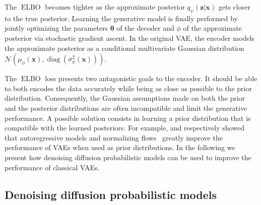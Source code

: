 \documentclass{article}
\newcommand{\diag}{\operatorname{diag}}
\begin{document}
The $\operatorname{ELBO}$ becomes tighter as the approximate posterior $q_\psi(\mathbf{z}|\mathbf{x})$ gets closer to the true posterior. 
Learning the generative model is finally performed by jointly optimizing the parameters $\mathbf{\theta}$ of the decoder and $\phi$ of the approximate posterior via stochastic gradient ascent. 
In the original VAE, the encoder models the approximate posterior as a conditional multivariate Gaussian distribution $\mathcal{N}(\mu_\phi(\mathbf{x}), \diag(\sigma_\phi^2(\mathbf{x})))$.

The $\operatorname{ELBO}$ loss presents two antagonistic goals to the encoder.
It should be able to both encodes the data accurately while being as close as possible to the prior distribution. Consequently, the Gaussian assumptions made on both the prior and the posterior distributions are often incompatible and limit the generative performance. 
A possible solution consists in learning a prior distribution that is compatible with the learned posteriors. For example, \citet{PriorAutoreg2019} and \citet{PriorNF2017} respectively showed that autoregressive models and normalizing flows~\citep[NFs]{rezende2015variational} greatly improve the performance of VAEs when used as prior distributions. 
In the following we present how denoising diffusion probabilistic models can be used to improve the performance of classical VAEs.

\subsection{Denoising diffusion probabilistic models}
\end{document}
